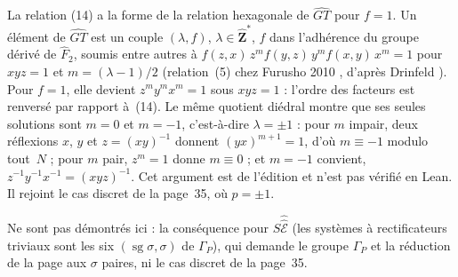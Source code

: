 \begin{remarque}
La relation (14) a la forme de la relation hexagonale de $\widehat{GT}$ pour $f = 1$. Un élément de $\widehat{GT}$ est un couple $(\lambda, f)$, $\lambda \in \hat{\mathbf Z}^*$, $f$ dans l'adhérence du groupe dérivé de $\hat F_2$, soumis entre autres à $f(z, x)\,z^m f(y, z)\,y^m f(x, y)\,x^m = 1$ pour $xyz = 1$ et $m = (\lambda - 1)/2$ (relation~(5) chez Furusho 2010 \cite{furusho2010}, d'après Drinfeld \cite{drinfeld1990}). Pour $f = 1$, elle devient $z^m y^m x^m = 1$ sous $xyz = 1$ : l'ordre des facteurs est renversé par rapport à~(14). Le même quotient diédral montre que ses seules solutions sont $m = 0$ et $m = -1$, c'est-à-dire $\lambda = \pm 1$ : pour $m$ impair, deux réflexions $x$, $y$ et $z = (xy)^{-1}$ donnent $(yx)^{m+1} = 1$, d'où $m \equiv -1$ modulo tout~$N$ ; pour $m$ pair, $z^m = 1$ donne $m \equiv 0$ ; et $m = -1$ convient, $z^{-1}y^{-1}x^{-1} = (xyz)^{-1}$. Cet argument est de l'édition et n'est pas vérifié en Lean. Il rejoint le cas discret de la page~35, où $p = \pm 1$.
\end{remarque}

Ne sont pas démontrés ici : la conséquence pour $S\hat{\hat{\mathcal E}}$ (les systèmes à rectificateurs triviaux sont les six $(\operatorname{sg}\sigma, \sigma)$ de $\Gamma_P$), qui demande le groupe $\Gamma_P$ et la réduction de la page aux $\sigma$ paires, ni le cas discret de la page~35.
